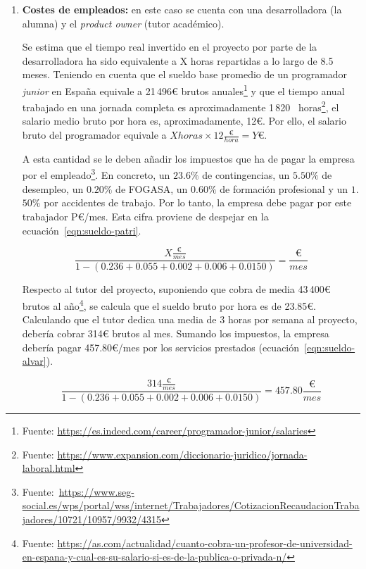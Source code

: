 \begin{enumerate}
	\item\textbf{Costes de empleados:} en este caso se cuenta con una desarrolladora (la alumna) y el \textit{product owner} (tutor académico).

Se estima que el tiempo real invertido en el proyecto por parte de la desarrolladora ha sido equivalente a X horas repartidas a lo largo de 8.5 meses. Teniendo en cuenta que el sueldo base promedio de un programador \textit{junior} en España equivale a 21\,496€ brutos anuales\footnote{Fuente: \url{https://es.indeed.com/career/programador-junior/salaries}} y que el tiempo anual trabajado en una jornada completa es aproximadamente 1\,820 ~horas\footnote{Fuente: \url{ https://www.expansion.com/diccionario-juridico/jornada-laboral.html}}, el salario medio bruto por hora es, aproximadamente, 12€. Por ello, el salario bruto del programador equivale a $X horas \times 12\frac{\text{€}}{hora} = Y \text{€}$.

A esta cantidad se le deben añadir los impuestos que ha de pagar la empresa por el empleado\footnote{Fuente:~\url{https://www.seg-social.es/wps/portal/wss/internet/Trabajadores/CotizacionRecaudacionTrabajadores/10721/10957/9932/4315}}. En concreto, un $23$.$6\%$ de contingencias, un $5$.$50\%$ de desempleo, un $0$.$20\%$ de FOGASA, un $0$.$60\%$ de formación profesional y un $1$.$50\%$ por accidentes de trabajo. Por lo tanto, la empresa debe pagar por este trabajador P€/mes. Esta cifra proviene de despejar en la ecuación~\ref{eqn:sueldo-patri}.

\begin{equation}\label{eqn:sueldo-patri} \frac{X\frac{\text{€}}{mes}}{1 - (0\text{.}236 + 0\text{.}055 + 0\text{.}002 + 0\text{.}006 + 0\text{.}0150)} =  \frac{\text{€}}{mes}\end{equation}


Respecto al tutor del proyecto, suponiendo que cobra de media 43\,400€ brutos al año\footnote{Fuente: \url{https://as.com/actualidad/cuanto-cobra-un-profesor-de-universidad-en-espana-y-cual-es-su-salario-si-es-de-la-publica-o-privada-n/}}, se calcula que el sueldo bruto por hora es de 23.85€. Calculando que el tutor dedica una media de 3 horas por semana al proyecto, debería cobrar 314€ brutos al mes. Sumando los impuestos, la empresa debería pagar 457.80€/mes por los servicios prestados (ecuación~\ref{eqn:sueldo-alvar}).

\begin{equation}\label{eqn:sueldo-alvar} \frac{314 \frac{\text{€}}{mes}}{1 - (0\text{.}236 + 0\text{.}055 + 0\text{.}002 + 0\text{.}006 + 0\text{.}0150)} = 457\text{.}80 \frac{\text{€}}{mes}\end{equation}


\end{enumerate}
